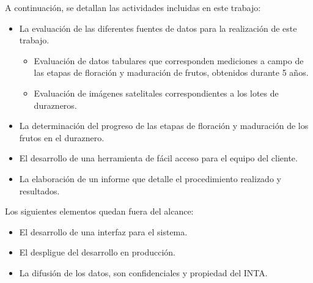 A continuación, se detallan las actividades incluidas en este trabajo:

\begin{itemize}
  \item La evaluación de las diferentes fuentes de datos para la realización de este trabajo.
  \begin{itemize}
    \item Evaluación de datos tabulares que corresponden mediciones a 
    campo de las etapas de floración y maduración de frutos, obtenidos durante 5 años.
    \item Evaluación de imágenes satelitales correspondientes a los lotes de durazneros.
  \end{itemize}
  \item La determinación del progreso de las etapas de floración y maduración de los frutos en el
  duraznero.
  \item El desarrollo de una herramienta de fácil acceso para el equipo del cliente.
  \item La elaboración de un informe que detalle el procedimiento realizado y resultados.
\end{itemize}

Los siguientes elementos quedan fuera del alcance:

\begin{itemize}
  \item El desarrollo de una interfaz para el sistema.
  \item El despligue del desarrollo en producción.
  \item La difusión de los datos, son confidenciales y propiedad del INTA.
\end{itemize}

